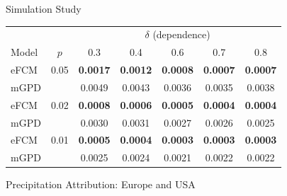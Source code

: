 \documentclass[final]{beamer}
\newlength{\colwidth}
\begin{document}
\begin{frame}[t]
\begin{columns}[t]
\begin{column}{\colwidth}
\begin{block}{Simulation Study}
\begin{center}
\scriptsize
\renewcommand{\arraystretch}{1.1}
\begin{tabular}{l c|ccccc}
      & & \multicolumn{5}{c}{$\delta$ (dependence)} \\
      Model & $p$ & 0.3 & 0.4 & 0.6 & 0.7 & 0.8 \\
      \toprule
      eFCM & 0.05 & \textbf{0.0017} & \textbf{0.0012} & \textbf{0.0008} & \textbf{0.0007} & \textbf{0.0007} \\
      mGPD &      & 0.0049 & 0.0043 & 0.0036 & 0.0035 & 0.0038 \\
      \midrule
      eFCM & 0.02 & \textbf{0.0008} & \textbf{0.0006} & \textbf{0.0005} & \textbf{0.0004} & \textbf{0.0004} \\
      mGPD &      & 0.0030 & 0.0031 & 0.0027 & 0.0026 & 0.0025 \\
      \midrule
      eFCM & 0.01 & \textbf{0.0005} & \textbf{0.0004} & \textbf{0.0003} & \textbf{0.0003} & \textbf{0.0003} \\
      mGPD &      & 0.0025 & 0.0024 & 0.0021 & 0.0022 & 0.0022 \\
\bottomrule
\end{tabular}
\end{center}

\end{block}

\vspace{-0.5cm}
\begin{block}{Precipitation Attribution: Europe and USA}


\end{block}
\end{column}
\end{columns}
\end{frame}
\end{document}
